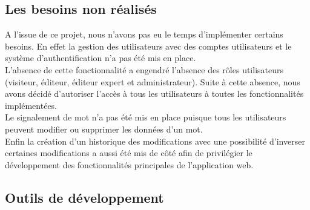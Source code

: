 \documentclass[12pt,a4paper]{article}
\begin{document}
\subsection{Les besoins non réalisés}

A l'issue de ce projet, nous n'avons pas eu le temps d'implémenter certains besoins.
En effet la gestion des utilisateurs avec des comptes utilisateurs et le système d'authentification n'a pas été mis en place. \\
L'absence de cette fonctionnalité a engendré l'absence des rôles utilisateurs (visiteur, éditeur, éditeur expert et administrateur). Suite à cette absence, nous avons décidé d'autoriser l'accès à tous les utilisateurs à toutes les fonctionnalités implémentées. \\
Le signalement de mot n'a pas été mis en place puisque tous les utilisateurs peuvent modifier ou supprimer les données d'un mot. \\
Enfin la création d'un historique des modifications avec une possibilité d'inverser certaines modifications a aussi été mis de côté afin de privilégier le développement des fonctionnalités principales de l'application web.

\subsection{Outils de développement}
\end{document}
